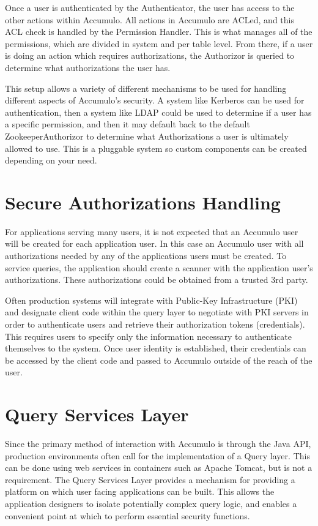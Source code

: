 Once a user is authenticated by the Authenticator, the user has access to the other actions within 
Accumulo. All actions in Accumulo are ACLed, and this ACL check is handled by the Permission 
Handler. This is what manages all of the permissions, which are divided in system and per table 
level. From there, if a user is doing an action which requires authorizations, the Authorizor is 
queried to determine what authorizations the user has.

This setup allows a variety of different mechanisms to be used for handling different aspects of 
Accumulo's security. A system like Kerberos can be used for authentication, then a system like LDAP 
could be used to determine if a user has a specific permission, and then it may default back to the 
default ZookeeperAuthorizor to determine what Authorizations a user is ultimately allowed to use. 
This is a pluggable system so custom components can be created depending on your need.

\section{Secure Authorizations Handling}

For applications serving many users, it is not expected that an Accumulo user
will be created for each application user. In this case an Accumulo user with
all authorizations needed by any of the applications users must be created. To
service queries, the application should create a scanner with the application
user's authorizations. These authorizations could be obtained from a trusted 3rd
party.

Often production systems will integrate with Public-Key Infrastructure (PKI) and
designate client code within the query layer to negotiate with PKI servers in order
to authenticate users and retrieve their authorization tokens (credentials). This
requires users to specify only the information necessary to authenticate themselves
to the system. Once user identity is established, their credentials can be accessed by
the client code and passed to Accumulo outside of the reach of the user.

\section{Query Services Layer}

Since the primary method of interaction with Accumulo is through the Java API,
production environments often call for the implementation of a Query layer. This
can be done using web services in containers such as Apache Tomcat, but is not a
requirement. The Query Services Layer provides a mechanism for providing a
platform on which user facing applications can be built. This allows the application
designers to isolate potentially complex query logic, and enables a convenient point
at which to perform essential security functions.

